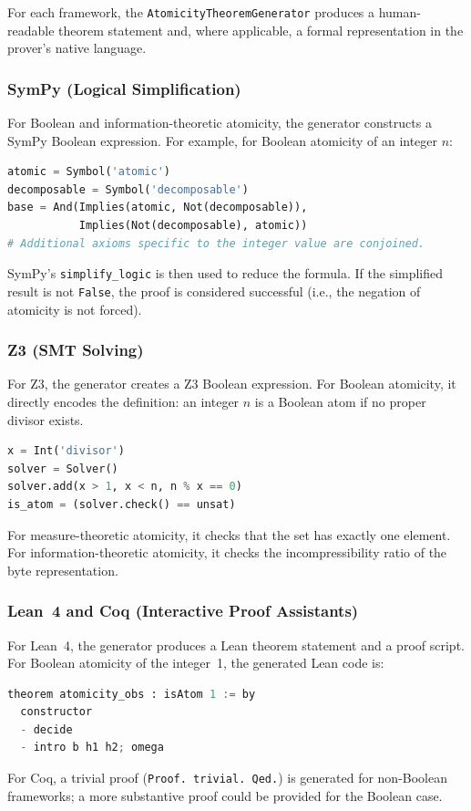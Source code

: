 For each framework, the \texttt{AtomicityTheoremGenerator} produces a human-readable theorem statement and, where applicable, a formal representation in the prover's native language.

\subsubsection{SymPy (Logical Simplification)}
For Boolean and information-theoretic atomicity, the generator constructs a SymPy Boolean expression. For example, for Boolean atomicity of an integer $n$:
\begin{lstlisting}[language=Python]
atomic = Symbol('atomic')
decomposable = Symbol('decomposable')
base = And(Implies(atomic, Not(decomposable)),
           Implies(Not(decomposable), atomic))
# Additional axioms specific to the integer value are conjoined.
\end{lstlisting}
SymPy's \texttt{simplify\_logic} is then used to reduce the formula. If the simplified result is not \texttt{False}, the proof is considered successful (i.e., the negation of atomicity is not forced).

\subsubsection{Z3 (SMT Solving)}
For Z3, the generator creates a Z3 Boolean expression. For Boolean atomicity, it directly encodes the definition: an integer $n$ is a Boolean atom if no proper divisor exists.
\begin{lstlisting}[language=Python]
x = Int('divisor')
solver = Solver()
solver.add(x > 1, x < n, n % x == 0)
is_atom = (solver.check() == unsat)
\end{lstlisting}
For measure-theoretic atomicity, it checks that the set has exactly one element. For information-theoretic atomicity, it checks the incompressibility ratio of the byte representation.

\subsubsection{Lean~4 and Coq (Interactive Proof Assistants)}
For Lean~4, the generator produces a Lean theorem statement and a proof script. For Boolean atomicity of the integer~1, the generated Lean code is:
\begin{lstlisting}[language=Python]
theorem atomicity_obs : isAtom 1 := by
  constructor
  - decide
  - intro b h1 h2; omega
\end{lstlisting}
For Coq, a trivial proof (\texttt{Proof. trivial. Qed.}) is generated for non-Boolean frameworks; a more substantive proof could be provided for the Boolean case.

